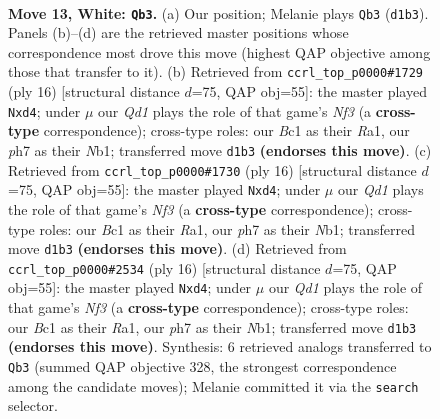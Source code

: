 \documentclass[11pt]{article}
\begin{document}
\clearpage

\begin{figure}[p]\centering
\begin{subfigure}{0.46\textwidth}\centering
\resizebox{\linewidth}{!}{%
\newchessgame
\chessboard[
  setfen={r1bqkb1r/p4ppp/1pn5/3pP3/7P/5N2/PP3PPK/RNBQ1R2 w q - 0 13},
  showmover=false,
  pgfstyle=straightmove, color=movearrow, markmove={d1-b3}
]}
\caption{}
\end{subfigure}\hfill
\begin{subfigure}{0.46\textwidth}\centering
\resizebox{\linewidth}{!}{%
\newchessgame
\chessboard[
  setfen={r2qkbnr/ppp2ppp/2b5/8/3pP3/5N2/PP3PPP/RNBQ1RK1 w kq - 0 9},
  showmover=false,
  pgfstyle=straightmove, color=movearrow, markmove={f3-d4}
]}
\caption{}
\end{subfigure}
\\[4pt]
\begin{subfigure}{0.46\textwidth}\centering
\resizebox{\linewidth}{!}{%
\newchessgame
\chessboard[
  setfen={r2qkbnr/ppp2ppp/2b5/8/3pP3/5N2/PP3PPP/RNBQ1RK1 w kq - 0 9},
  showmover=false,
  pgfstyle=straightmove, color=movearrow, markmove={f3-d4}
]}
\caption{}
\end{subfigure}\hfill
\begin{subfigure}{0.46\textwidth}\centering
\resizebox{\linewidth}{!}{%
\newchessgame
\chessboard[
  setfen={r2qkbnr/ppp2ppp/2b5/8/3pP3/5N2/PP3PPP/RNBQ1RK1 w kq - 0 9},
  showmover=false,
  pgfstyle=straightmove, color=movearrow, markmove={f3-d4}
]}
\caption{}
\end{subfigure}
\caption{\textbf{Move 13, White: \texttt{Qb3}.} (a) Our position; Melanie plays \texttt{Qb3} (\texttt{d1b3}). Panels (b)--(d) are the retrieved master positions whose correspondence most drove this move (highest QAP objective among those that transfer to it). (b) Retrieved from \texttt{ccrl\_top\_p0000\#1729} (ply 16) [structural distance $d$=75, QAP obj=55]: the master played \texttt{Nxd4}; under $\mu$ our \emph{Qd1} plays the role of that game's \emph{Nf3} (a \textbf{cross-type} correspondence); cross-type roles: our \emph{B}c1 as their \emph{R}a1, our \emph{p}h7 as their \emph{N}b1; transferred move \texttt{d1b3} \textbf{(endorses this move)}. (c) Retrieved from \texttt{ccrl\_top\_p0000\#1730} (ply 16) [structural distance $d$=75, QAP obj=55]: the master played \texttt{Nxd4}; under $\mu$ our \emph{Qd1} plays the role of that game's \emph{Nf3} (a \textbf{cross-type} correspondence); cross-type roles: our \emph{B}c1 as their \emph{R}a1, our \emph{p}h7 as their \emph{N}b1; transferred move \texttt{d1b3} \textbf{(endorses this move)}. (d) Retrieved from \texttt{ccrl\_top\_p0000\#2534} (ply 16) [structural distance $d$=75, QAP obj=55]: the master played \texttt{Nxd4}; under $\mu$ our \emph{Qd1} plays the role of that game's \emph{Nf3} (a \textbf{cross-type} correspondence); cross-type roles: our \emph{B}c1 as their \emph{R}a1, our \emph{p}h7 as their \emph{N}b1; transferred move \texttt{d1b3} \textbf{(endorses this move)}. Synthesis: 6 retrieved analogs transferred to \texttt{Qb3} (summed QAP objective 328, the strongest correspondence among the candidate moves); Melanie committed it via the \texttt{search} selector.}
\label{fig:thought-m24}
\end{figure}
\end{document}
